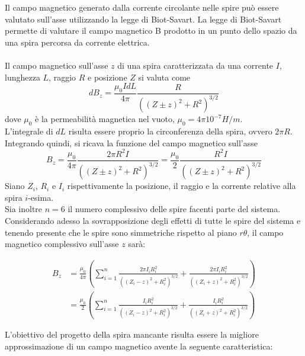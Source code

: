 \documentclass[a4paper, 11pt]{article}
\begin{document}
\noindent
Il campo magnetico generato dalla corrente circolante nelle spire può essere
valutato sull’asse utilizzando la legge di Biot-Savart. La legge di Biot-Savart
permette di valutare il campo magnetico B prodotto in un punto dello spazio da
una spira percorsa da corrente elettrica. \\ \\
\noindent
Il campo magnetico sull’asse $z$  di una spira caratterizzata da una corrente
$I$, lunghezza $L$, raggio $R$ e posizione $Z$ si valuta come
\[dB_{z}=\frac{\mu_{0}IdL}{4\pi}\frac{R}{\left((Z{\pm}z)^{2}+R^{2}\right)^{3/2}}\]
dove $\mu_{0}$ è la permeabilità magnetica nel vuoto, $\mu_{0}=4{\pi}10^{-7}
H/m$. \\
L’integrale di $dL$ risulta essere proprio la circonferenza della spira, ovvero
$2{\pi}R$. Integrando quindi, si ricava la funzione del campo magnetico
sull'asse
\[B_{z}=\frac{\mu_{0}}{4\pi}\frac{2{\pi}R^{2}I}{\left((Z{\pm}z)^{2}+R^{2}\right)^{3/2}}=\frac{\mu_{0}}{2}\frac{R^{2}I}{\left((Z{\pm}z)^{2}+R^{2}\right)^{3/2}}\]
Siano $Z_{i}$, $R_{i}$ e $I_{i}$ rispettivamente la posizione, il raggio e la
corrente relative alla spira $i$-esima. \\
Sia inoltre $n=6$ il numero complessivo delle spire facenti parte del sistema.
Considerando adesso la sovrapposizione degli effetti di tutte le spire del
sistema e tenendo presente che le spire sono simmetriche rispetto al piano
$r{\theta}$, il campo magnetico complessivo sull’asse $z$ sarà:

\begin{align*}
    B_{z}
    &=\frac{\mu_{0}}{4{\pi}}\left(\sum_{i=1}^{n}\frac{2{\pi}I_{i}R_{i}^{2}}{\left(\left(Z_{i}-z\right)^{2}+R_{i}^{2}\right)^{3/2}}+\frac{2{\pi}I_{i}R_{i}^{2}}{\left(\left(Z_{i}+z\right)^{2}+R_{i}^{2}\right)^{3/2}}\right)\\
    &=\frac{\mu_{0}}{2}\left(\sum_{i=1}^{n}\frac{I_{i}R_{i}^{2}}{\left(\left(Z_{i}-z\right)^{2}+R_{i}^{2}\right)^{3/2}}+\frac{I_{i}R_{i}^{2}}{\left(\left(Z_{i}+z\right)^{2}+R_{i}^{2}\right)^{3/2}}\right)
\end{align*}

\noindent
L'obiettivo del progetto della spira mancante risulta essere la migliore
approssimazione di un campo magnetico avente la seguente caratteristica:
\end{document}
